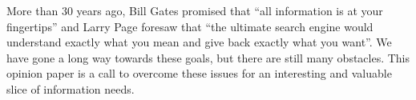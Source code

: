 \documentclass[11pt]{article}
\begin{document}

More than 30 years ago, 
%
Bill Gates promised that ``all information is at your fingertips''
and Larry Page foresaw that ``the ultimate search engine would understand exactly
what you mean and give back exactly what you want''.
We have gone a long way towards these goals, but there are still
many obstacles.
This opinion paper is a call to overcome these issues 
for an interesting and valuable slice of information needs.



\end{document}
